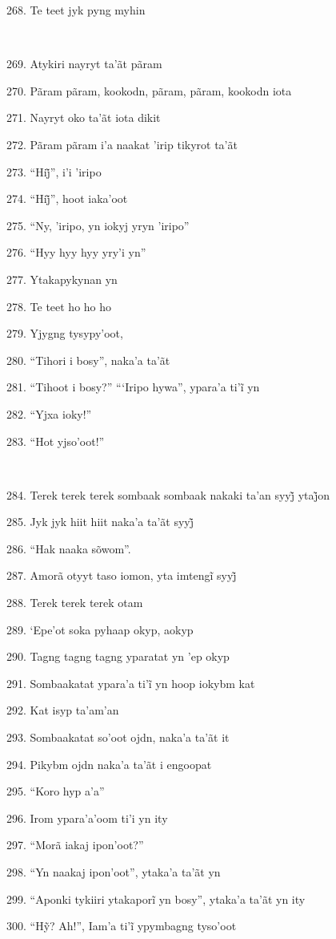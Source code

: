 268. Te teet jyk pyng myhin

~

269. Atykiri nayryt ta'ãt pãram

270. Pãram pãram, kookodn, pãram, pãram, kookodn iota

271. Nayryt oko ta'ãt iota dikit

272. Pãram pãram i'a naakat 'irip tikyrot ta'ãt

273. ``Hij̃'', i’i ’iripo

274. ``Hij̃'', hoot iaka’oot

275. ``Ny, 'iripo, yn iokyj yryn 'iripo''

276. ``Hyy hyy hyy yry'i yn''

277. Ytakapykynan yn

278. Te teet ho ho ho

279. Yjygng tysypy'oot,

280. ``Tihori i bosy'', naka'a ta'ãt

281. ``Tihoot i bosy?'' ``‘Iripo hywa'', ypara’a ti’ĩ yn

282. ``Yjxa ioky!''

283. ``Hot yjso'oot!''

~

284. Terek terek terek sombaak sombaak nakaki ta’an syyj̃ ytaj̃on

285. Jyk jyk hiit hiit naka’a ta’ãt syyj̃

286. ``Hak naaka sõwom''.

287. Amorã otyyt taso iomon, yta imtengĩ syyj̃

288. Terek terek terek otam

289. `Epe'ot soka pyhaap okyp, aokyp

290. Tagng tagng tagng yparatat yn 'ep okyp

291. Sombaakatat ypara’a ti’ĩ yn hoop iokybm kat

292. Kat isyp ta'am'an

293. Sombaakatat so'oot ojdn, naka'a ta'ãt it

294. Pikybm ojdn naka'a ta'ãt i engoopat

295. ``Koro hyp a'a''

296. Irom ypara'a'oom ti'i yn ity

297. ``Morã iakaj ipon'oot?''

298. ``Yn naakaj ipon'oot'', ytaka'a ta'ãt yn

299. ``Aponki tykiiri ytakaporĩ yn bosy'', ytaka’a ta’ãt yn ity

300. ``Hỹ? Ah!'', Iam’a ti’ĩ ypymbagng tyso’oot

